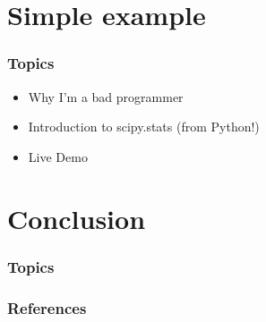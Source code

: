 \documentclass{beamer}
\begin{document}
\section{Simple example}
\begin{frame}


\frametitle{Topics}

\begin{itemize}

    \item Why I'm a bad programmer
    \item Introduction to scipy.stats (from Python!)
    \item Live Demo

\end{itemize}

\end{frame}
\section{Conclusion}
\begin{frame}


\frametitle{Topics}

\end{frame}

\begin{frame}[t,allowframebreaks]
\frametitle{References}
\printbibliography
\end{frame}
\end{document}
